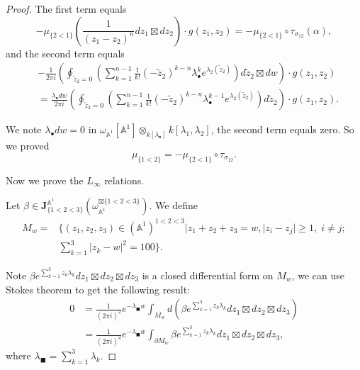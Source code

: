 \documentclass[11pt]{amsart}
\theoremstyle{definition}
\theoremstyle{remark}
\numberwithin{equation}{section}
\begin{document}
\begin{proof}
The first term equals
$$
-\mu_{\{2<1\}}(\frac{1}{(z_{1}-z_{2})^{n}}dz_{1}\boxtimes dz_{2})\cdot g(z_{1},z_{2})=-\mu_{\{2<1\}}\circ\tau_{\sigma_{12}}(\alpha),
$$
and the second term equals
\begin{align*}
    &-\frac{1}{2\pi i}\left(\oint_{\tilde{z}_{2}=0}\left(\sum_{k=1}^{n-1}\frac{1}{k!}(-\tilde{z}_{2})^{k-n} \lambda_{\bullet}^{k}e^{\lambda_{2}(\tilde{z}_{2})}\right)d\tilde{z}_{2}\boxtimes dw\right)\cdot g(z_{1},z_{2})\\
     &=
     \frac{\lambda_{\bullet}dw}{2\pi i}\left(\oint_{\tilde{z}_{2}=0}\left(\sum_{k=1}^{n-1}\frac{1}{k!}(-\tilde{z}_{2})^{k-n} \lambda_{\bullet}^{k-1}e^{\lambda_{2}(\tilde{z}_{2})}\right)d\tilde{z}_{2}\right)\cdot g(z_{1},z_{2}).
\end{align*}

We note $\lambda_{\bullet}dw=0$ in $\omega_{\mathbb{A}^{1}}[\mathbb{A}^{1}]\otimes_{k[\lambda_{\bullet}]}k[\lambda_{1},\lambda_{2}]$, the second term equals zero. So we proved 
$$
\mu_{\{1<2\}}=-\mu_{\{2<1\}}\circ \tau_{\sigma_{12}}.
$$

Now we prove the $L_{\infty}$ relations.

Let $\beta\in \mathbf{J}^{\mathbb{A}^1}_{\{1<2<3\}}(\omega_{\mathbb{A}^1}^{\boxtimes\{1<2<3\}})$. We define 
\begin{align*} 
M_{w}=&\{(z_{1},z_{2},z_{3})\in (\mathbb{A}^1)^{1<2<3}|z_{1}+z_{2}+z_{3}=w,|z_{i}-z_{j}|\geq 1,\;i\neq j;\\
&\sum_{k=1}^{3}|z_{k}-w|^{2}=100\}.
\end{align*}

Note $\beta e^{\sum_{k=1}^{3}z_{k}\lambda_{k}}dz_{1}\boxtimes dz_{2}\boxtimes dz_{3}$ is a closed differential form on $M_{w}$, we can use Stokes theorem to get the following result:
\begin{equation}
\begin{aligned}
\label{stokes thm1}
    0 &= 
    \frac{1}{(2\pi i)^{2}}e^{-\lambda_{\blacksquare }w}\int_{M_{w}}d\left(\beta e^{\sum_{k=1}^{3}z_{k}\lambda_{k}}dz_{1}\boxtimes dz_{2}\boxtimes dz_{3}\right)\\
    &=
     \frac{1}{(2\pi i)^{2}}e^{-\lambda_{\blacksquare }w}\int_{\partial M_{w}}\beta e^{\sum_{k=1}^{3}z_{k}\lambda_{k}}dz_{1}\boxtimes dz_{2}\boxtimes dz_{3},
\end{aligned}
\end{equation}
where $\lambda_{\blacksquare}=\sum_{k=1}^3\lambda_{k}$.


\end{proof}
\end{document}
